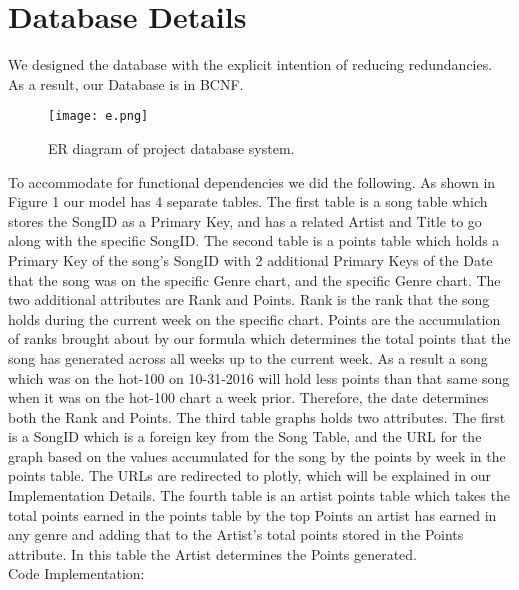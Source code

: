 \documentclass{article}
\begin{document}
\section*{Database Details}
We designed the database with the explicit intention of reducing redundancies. 
As a result, our Database is in BCNF. 
\begin{figure}
  \begin{center}
    \texttt{[image: e.png]}
    \caption{ER diagram of project database system.}
    \label{fig:ER}
  \end{center}
\end{figure}
To accommodate for functional dependencies we did the following.
As shown in Figure 1 our model has 4 separate tables. 
The first table is a song table which stores the SongID as a Primary Key, and has a related Artist and Title to go along with the specific SongID. 
The second table is a points table which holds a Primary Key of the song's SongID with 2 additional Primary Keys of the Date that the song was on the specific Genre chart, and the specific Genre chart. 
The two additional attributes are Rank and Points. Rank is the rank that the song holds during the current week on the specific chart. 
Points are the accumulation of ranks brought about by our formula which determines the total points that the song has generated across all weeks up to the current week. 
As a result a song which was on the hot-100 on 10-31-2016 will hold less points than that same song when it was on the hot-100 chart a week prior. 
Therefore, the date determines both the Rank and Points.
The third table graphs holds two attributes. The first is a SongID which is a foreign key from the Song Table, and the URL for the graph based on the values accumulated for the song by the points by week in the points table. The URLs are redirected to plotly, which will be explained in our Implementation Details.
The fourth table is an artist points table which takes the total points earned in the points table by the top Points an artist has earned in any genre and adding that to the Artist's total points stored in the Points attribute. 
In this table the Artist determines the Points generated.
\\ Code Implementation:
\end{document}
